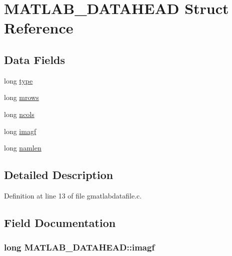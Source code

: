 \hypertarget{structMATLAB__DATAHEAD}{\section{M\-A\-T\-L\-A\-B\-\_\-\-D\-A\-T\-A\-H\-E\-A\-D Struct Reference}
\label{structMATLAB__DATAHEAD}
}
\subsection*{Data Fields}
\begin{DoxyCompactItemize}
\item 
long \hyperlink{structMATLAB__DATAHEAD_ad3587e58da5ca6cbe3cd98d5e2f46202}{type}
\item 
long \hyperlink{structMATLAB__DATAHEAD_abf1ef02c93522915bd7fdf9f72df44b7}{mrows}
\item 
long \hyperlink{structMATLAB__DATAHEAD_ae87d8eca5290fa03d01c79061498626f}{ncols}
\item 
long \hyperlink{structMATLAB__DATAHEAD_a7831e4f01682863fce4ba98071a7db08}{imagf}
\item 
long \hyperlink{structMATLAB__DATAHEAD_ad6e65844dcff1eb1cf7bf8752ba9a91c}{namlen}
\end{DoxyCompactItemize}


\subsection{Detailed Description}


Definition at line 13 of file gmatlabdatafile.\-c.



\subsection{Field Documentation}
\hypertarget{structMATLAB__DATAHEAD_a7831e4f01682863fce4ba98071a7db08}{
\subsubsection[{imagf}]{\setlength{\rightskip}{0pt plus 5cm}long M\-A\-T\-L\-A\-B\-\_\-\-D\-A\-T\-A\-H\-E\-A\-D\-::imagf}}\label{structMATLAB__DATAHEAD_a7831e4f01682863fce4ba98071a7db08}



